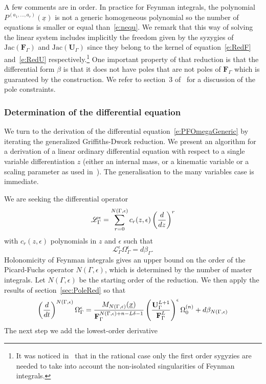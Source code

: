 \documentclass[a4paper,12pt]{article}
\numberwithin{equation}{section}
\numberwithin{figure}{section}
\begin{document}
A few comments are in order. In practice for Feynman integrals,   the polynomial $ P^{(a_1,\dots,a_r)}(\underline x)$ is not a generic
homogeneous polynomial so the number of equations is smaller or equal than~\eqref{e:nequ}.
%
We remark that this way of solving the linear system includes implicitly the
freedom given by the syzygies of $\textrm{Jac}(\textbf{F}_\Gamma)$ and
$\textrm{Jac}(\textbf{U}_\Gamma)$ since they belong to
the kernel of equation~\eqref{e:RedF} and~\eqref{e:RedU}
respectively.\footnote{It was noticed in~\cite{Lairez:2022zkj} that in
  the rational case only the first order sygyzies are needed to take
  into account the non-isolated singularities of Feynman integrals.}
%
%
%
One important property of that reduction is that the differential form $\beta$ is that it
does not have poles that are not poles of $\textbf{F}_\Gamma$ which is
guaranteed by the construction. We refer
to section~3 of~\cite{Lairez:2022zkj} for a discussion of the pole constraints.
%
%
\subsubsection{Determination of the differential equation}
\label{sec:deriv-diff-equat}


We turn to the derivation of the differential
equation~\eqref{e:PFOmegaGeneric}  by iterating the generalized
Griffiths-Dwork reduction. We present an algorithm for a derivation of
a linear ordinary differential equation with respect to a single
variable differentiation $z$ (either an internal mass, or a kinematic
variable or a scaling parameter as used
in~\cite{Lairez:2022zkj,Doran:2023yzu}). The generalisation to the
many variables case is immediate.

We are seeking the differential operator 
\begin{equation}\label{e:PFgeneric}
  \mathscr{L}_\Gamma^\epsilon=\sum_{r=0}^{N(\Gamma,\epsilon)}
  c_r(z,\epsilon) \left(d\over dz\right)^r
\end{equation}
with $c_r(z,\epsilon)$ polynomials in $z$ and $\epsilon$ such that
\begin{equation}
     \mathscr{L}_\Gamma^\epsilon \Omega_\Gamma^\epsilon= d\beta_\Gamma.
   \end{equation}
%
Holonomicity of Feynman integrals gives an upper bound on the order of the Picard-Fuchs operator $N(\Gamma,\epsilon)$, which is  determined by
 the number of master
integrals. Let $N(\Gamma,\epsilon)$  be the starting order of the reduction.  We then apply the results of
section~\ref{sec:PoleRed} so that
%
\begin{equation}\label{e:step1}
\left(d\over dt\right)^{N(\Gamma,\epsilon)} \Omega_\Gamma^\epsilon= {M_{
      N(\Gamma,\epsilon)}(\underline x)\over
    \textbf{F}_\Gamma^{N(\Gamma,\epsilon)+n-L\delta-1}
  }\left(\textbf{U}_\Gamma^{L+1}\over \textbf{F}_\Gamma^L
  \right)^\epsilon \Omega_0^{(n)}+ d\beta_{N(\Gamma,\epsilon)}  
\end{equation}
%
The next step we add the lowest-order derivative
\end{document}
